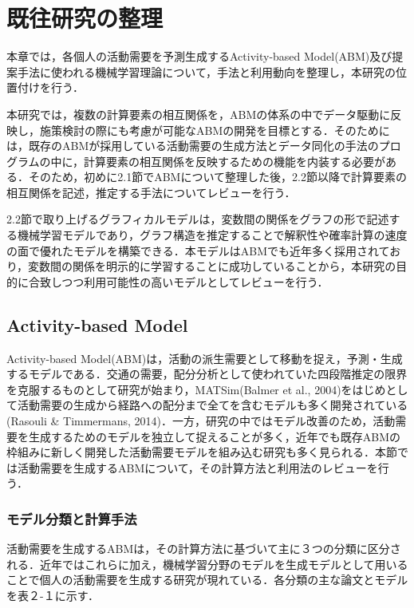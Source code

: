 \chapter{既往研究の整理}
\label{2}

本章では，各個人の活動需要を予測生成するActivity-based Model(ABM)及び提案手法に使われる機械学習理論について，手法と利用動向を整理し，本研究の位置付けを行う．

本研究では，複数の計算要素の相互関係を，ABMの体系の中でデータ駆動に反映し，施策検討の際にも考慮が可能なABMの開発を目標とする．そのためには，既存のABMが採用している活動需要の生成方法とデータ同化の手法のプログラムの中に，計算要素の相互関係を反映するための機能を内装する必要がある．そのため，初めに2.1節でABMについて整理した後，2.2節以降で計算要素の相互関係を記述，推定する手法についてレビューを行う．

2.2節で取り上げるグラフィカルモデルは，変数間の関係をグラフの形で記述する機械学習モデルであり，グラフ構造を推定することで解釈性や確率計算の速度の面で優れたモデルを構築できる．本モデルはABMでも近年多く採用されており，変数間の関係を明示的に学習することに成功していることから，本研究の目的に合致しつつ利用可能性の高いモデルとしてレビューを行う．

\section{Activity-based Model}\label{2.1}

Activity-based Model(ABM)は，活動の派生需要として移動を捉え，予測・生成するモデルである．交通の需要，配分分析として使われていた四段階推定の限界を克服するものとして研究が始まり，MATSim(Balmer et al., 2004)をはじめとして活動需要の生成から経路への配分まで全てを含むモデルも多く開発されている(Rasouli \& Timmermans, 2014)．一方，研究の中ではモデル改善のため，活動需要を生成するためのモデルを独立して捉えることが多く，近年でも既存ABMの枠組みに新しく開発した活動需要モデルを組み込む研究も多く見られる．本節では活動需要を生成するABMについて，その計算方法と利用法のレビューを行う．

\subsection{モデル分類と計算手法}\label{2.1.1}

活動需要を生成するABMは，その計算方法に基づいて主に３つの分類に区分される．近年ではこれらに加え，機械学習分野のモデルを生成モデルとして用いることで個人の活動需要を生成する研究が現れている．各分類の主な論文とモデルを表２-１に示す．

